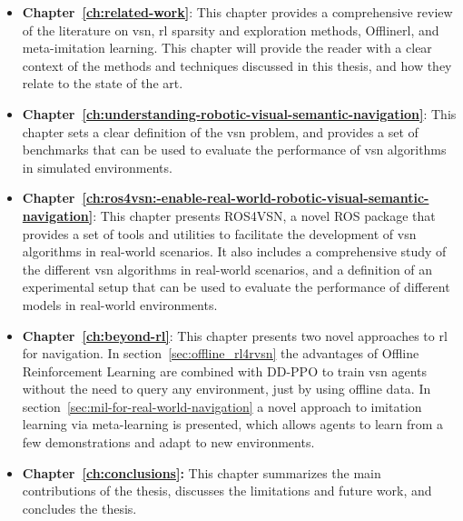 \begin{itemize}
    \item \textbf{Chapter~\ref{ch:related-work}}: This chapter provides a comprehensive review of the literature on \acrshort{vsn}, \acrshort{rl} sparsity and exploration methods, Offline\acrshort{rl}, and meta-imitation learning.
    This chapter will provide the reader with a clear context of the methods and techniques discussed in this thesis, and how they relate to the state of the art.
    \item \textbf{Chapter~\ref{ch:understanding-robotic-visual-semantic-navigation}}: This chapter sets a clear definition of the \acrshort{vsn} problem, and provides a set of benchmarks that can be used to evaluate the performance of \acrshort{vsn} algorithms in simulated environments.
    \item \textbf{Chapter~\ref{ch:ros4vsn:-enable-real-world-robotic-visual-semantic-navigation}}: This chapter presents ROS4VSN, a novel \acrshort{ROS} package that provides a set of tools and utilities to facilitate the development of \acrshort{vsn} algorithms in real-world scenarios.
    It also includes a comprehensive study of the different \acrshort{vsn} algorithms in real-world scenarios, and a definition of an experimental setup that can be used to evaluate the performance of different models in real-world environments.
    \item \textbf{Chapter~\ref{ch:beyond-rl}}: This chapter presents two novel approaches to \acrshort{rl} for navigation.
    In section~\ref{sec:offline_rl4rvsn} the advantages of Offline Reinforcement Learning are combined with DD-PPO to train \acrshort{vsn} agents without the need to query any environment, just by using offline data.
    In section~\ref{sec:mil-for-real-world-navigation} a novel approach to imitation learning via meta-learning is presented, which allows agents to learn from a few demonstrations and adapt to new environments.
    \item \textbf{Chapter~\ref{ch:conclusions}:} This chapter summarizes the main contributions of the thesis, discusses the limitations and future work, and concludes the thesis.
\end{itemize}
